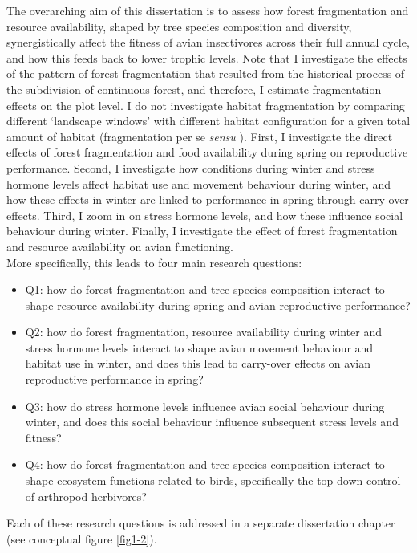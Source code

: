 \documentclass[10pt, twoside]{book} %
\begin{document}
The overarching aim of this dissertation is to assess how forest fragmentation and resource availability, shaped by tree species composition and diversity, synergistically affect the fitness of avian insectivores across their full annual cycle, and how this feeds back to lower trophic levels. Note that I investigate the effects of the pattern of forest fragmentation that resulted from the historical process of the subdivision of continuous forest, and therefore, I estimate fragmentation effects on the plot level. I do not investigate habitat fragmentation by comparing different `landscape windows' with different habitat configuration for a given total amount of habitat (fragmentation per se \textit{sensu} \citealt{Fahrig2017, Fahrig2019}). First, I investigate the direct effects of forest fragmentation and food availability during spring on reproductive performance. Second, I investigate how conditions during winter and stress hormone levels affect habitat use and movement behaviour during winter, and how these effects in winter are linked to performance in spring through carry-over effects. Third, I zoom in on stress hormone levels, and how these influence social behaviour during winter. Finally, I investigate the effect of forest fragmentation and resource availability on avian functioning.\\

More specifically, this leads to four main research questions:
\begin{itemize}
	\item Q1: how do forest fragmentation and tree species composition interact to shape resource availability during spring and avian reproductive performance?
	\item Q2: how do forest fragmentation, resource availability during winter and stress hormone levels interact to shape avian movement behaviour and habitat use in winter, and does this lead to carry-over effects on avian reproductive performance in spring?
	\item Q3: how do stress hormone levels influence avian social behaviour during winter, and does this social behaviour influence subsequent stress levels and fitness?
	\item Q4: how do forest fragmentation and tree species composition interact to shape ecosystem functions related to birds, specifically the top down control of arthropod herbivores? 
\end{itemize}

Each of these research questions is addressed in a separate dissertation chapter (see conceptual figure \ref{fig1-2}).
	
\end{document}
